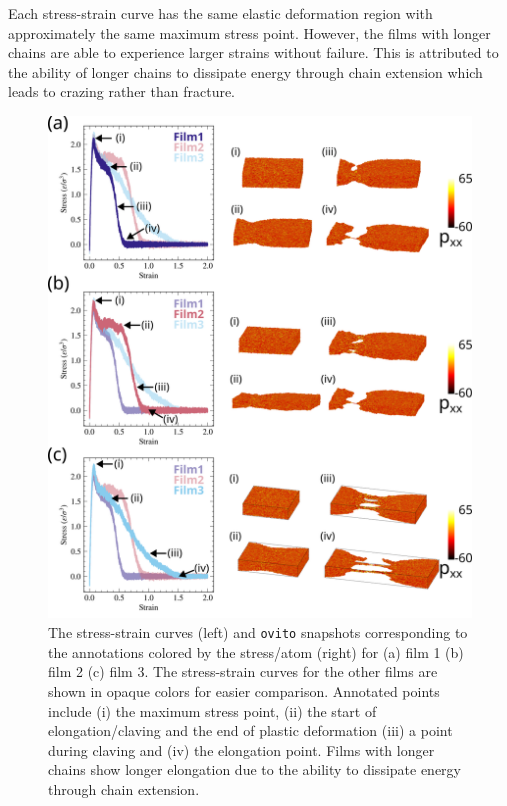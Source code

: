 \documentclass[10pt,a4paper]{labreport}
\begin{document}
Each stress-strain curve has the same elastic deformation region with approximately the same maximum stress point. 
However, the films with  longer chains are able to experience larger strains without failure. 
This is attributed to the ability of longer chains to dissipate energy through chain extension which leads to crazing rather than fracture.  
\begin{figure}[p]
  \centering
  \includegraphics[width= \textwidth]{figs/ass2_films_results.png}
  \caption{The stress-strain curves (left) and \texttt{ovito} snapshots corresponding to the annotations  colored by the stress/atom (right) for (a) film 1 (b) film 2 (c) film 3. The stress-strain curves for the other films are shown in opaque colors for easier comparison. Annotated points include (i) the maximum stress point, (ii) the start of elongation/claving and the end of plastic deformation (iii) a point during claving and (iv) the elongation point. Films with longer chains show longer elongation due to the ability to dissipate energy through chain extension. }
  \label{fig:ass2_deform_films}
\end{figure}
\end{document}
